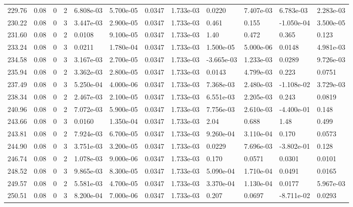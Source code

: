 \documentclass[preview]{standalone}
\begin{document}
{{{{{{\begin{tabular}{L{1.2cm}C{1.2cm} C{0.3cm}C{0.5cm} C{1.4cm}C{1.4cm} C{1.4cm}C{1.4cm} C{1.6cm}C{1.6cm} C{1.6cm}C{1.6cm}}
  229.76  &  0.08  & 0     &  2 &  6.808e-03  & 5.700e-05  &  0.0347&   1.733e-03& 0.0220 & 7.407e-03   &  6.783e-03 & 2.283e-03  \\ 
  230.22  &  0.08  & 0     &  3 &  3.447e-03  & 2.900e-05  &  0.0347&   1.733e-03& 0.461 & 0.155   &  -1.050e-04 & 3.500e-05  \\ 
  231.60  &  0.08  & 0     &  2 &  0.0108  & 9.100e-05  &  0.0347&   1.733e-03& 1.40 & 0.472   &  0.365 & 0.123  \\ 
  233.24  &  0.08  & 0     &  3 &  0.0211  & 1.780e-04  &  0.0347&   1.733e-03& 1.500e-05 & 5.000e-06   &  0.0148 & 4.981e-03  \\ 
  234.58  &  0.08  & 0     &  3 &  3.167e-03  & 2.700e-05  &  0.0347&   1.733e-03& -3.665e-03 & 1.233e-03   &  0.0289 & 9.726e-03  \\ 
  235.94  &  0.08  & 0     &  2 &  3.362e-03  & 2.800e-05  &  0.0347&   1.733e-03& 0.0143 & 4.799e-03   &  0.223 & 0.0751  \\ 
  237.49  &  0.08  & 0     &  3 &  5.250e-04  & 4.000e-06  &  0.0347&   1.733e-03& 7.368e-03 & 2.480e-03   &  -1.108e-02 & 3.729e-03  \\ 
  238.34  &  0.08  & 0     &  2 &  2.467e-03  & 2.100e-05  &  0.0347&   1.733e-03& 6.551e-03 & 2.205e-03   &  0.243 & 0.0819  \\ 
  240.96  &  0.08  & 0     &  2 &  7.072e-03  & 5.900e-05  &  0.0347&   1.733e-03& 7.756e-03 & 2.610e-03   &  -4.400e-01 & 0.148  \\ 
  243.66  &  0.08  & 0     &  3 &  0.0160  & 1.350e-04  &  0.0347&   1.733e-03& 2.04 & 0.688   &  1.48 & 0.499  \\ 
  243.81  &  0.08  & 0     &  2 &  7.924e-03  & 6.700e-05  &  0.0347&   1.733e-03& 9.260e-04 & 3.110e-04   &  0.170 & 0.0573  \\ 
  244.90  &  0.08  & 0     &  3 &  3.751e-03  & 3.200e-05  &  0.0347&   1.733e-03& 0.0229 & 7.696e-03   &  -3.802e-01 & 0.128  \\ 
  246.74  &  0.08  & 0     &  2 &  1.078e-03  & 9.000e-06  &  0.0347&   1.733e-03& 0.170 & 0.0571   &  0.0301 & 0.0101  \\ 
  248.52  &  0.08  & 0     &  3 &  9.865e-03  & 8.300e-05  &  0.0347&   1.733e-03& 5.090e-04 & 1.710e-04   &  0.0491 & 0.0165  \\ 
  249.57  &  0.08  & 0     &  2 &  5.581e-03  & 4.700e-05  &  0.0347&   1.733e-03& 3.370e-04 & 1.130e-04   &  0.0177 & 5.967e-03  \\ 
  250.51  &  0.08  & 0     &  3 &  8.200e-04  & 7.000e-06  &  0.0347&   1.733e-03& 0.207 & 0.0697   &  -8.711e-02 & 0.0293  \\ 

\end{tabular}}}}}}}
\end{document}
